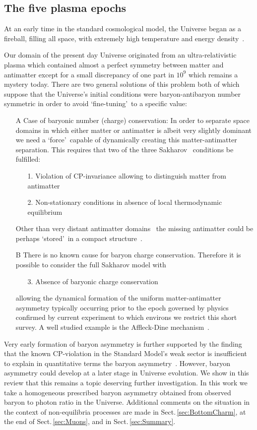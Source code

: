 \documentclass[universe,article,submit,moreauthors,pdftex,a4paper]{Definitions/mdpi}
\newcommand*{\rsec}[1]{Sect.\,{\ref{#1}}}
\newcommand*{\xblue}{\color{black}}
\begin{document}
\subsection{The five plasma epochs}\label{sec:Timeline}
\noindent At an early time in the standard cosmological model, the Universe began as a fireball, filling all space, with extremely high temperature and energy density~\cite{Rafelski:2015cxa}. {\xblue Our domain of the present day Universe originated from an ultra-relativistic plasma which contained almost a perfect symmetry between matter and antimatter except for a small discrepancy of one part in $10^{9}$ which remains a mystery today. There are two general solutions of this problem both of which suppose that the Universe's initial conditions were baryon-antibaryon number symmetric in order to avoid \lq fine-tuning\rq\ to a specific value:
\begin{itemize}
\item[A] Case of baryonic number (charge) conservation: In order to separate space domains in which either matter or antimatter is albeit very slightly dominant we  need a \lq force\rq\ capable of dynamically creating this matter-antimatter separation. This requires that two of the three Sakharov~\cite{Sakharov:1967dj,Sakharov:1988vdp} conditions be fulfilled:
\begin{itemize}
 \item[1.] Violation of CP-invariance allowing to distinguish matter from antimatter
 \item[2.] Non-stationary conditions in absence of local thermodynamic equilibrium
\end{itemize}
Other than very distant antimatter domains~\cite{Cohen:1997ac} the missing antimatter could be perhaps \lq stored\rq\ in a compact structure~\cite{Khlopov:2000as,Blinnikov:2014nea,Khlopov:2023dbg}. 
\item[B] There is no known cause for baryon charge conservation. Therefore it is possible to consider the full Sakharov model with 
\begin{itemize}
 \item[3.] Absence of baryonic charge conservation 
\end{itemize}
allowing the dynamical formation of the uniform matter-antimatter asymmetry typically occurring prior to the epoch governed by physics confirmed by current experiment to which environs we restrict this short survey. A well studied example is the Affleck-Dine
mechanism~\cite{Affleck:1984fy}.
\end{itemize} 
Very early formation of baryon asymmetry is further supported by the finding that the known CP-violation in the Standard Model's weak sector is insufficient to explain in quantitative terms the baryon asymmetry~\cite{Rubakov:1996vz}. However,  baryon asymmetry could  develop at a later stage in Universe evolution. We show in this review that this remains a topic deserving further investigation. In this work we take a homogeneous prescribed baryon asymmetry obtained from observed baryon to photon ratio in the Universe. Additional comments on the situation in the context of non-equilibria processes are made in \rsec{sec:BottomCharm}, at the end of \rsec{sec:Muons}, and in \rsec{sec:Summary}. 

}
\end{document}
